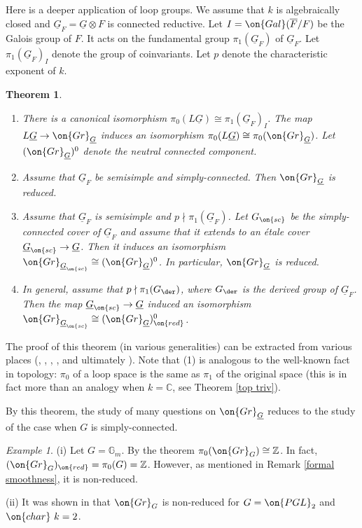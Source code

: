 \documentclass[]{pcmi}
\theoremstyle{plain}
\newtheorem{thm}[equation]{Theorem}
\theoremstyle{remark}
\newtheorem{ex}[equation]{Example}
\theoremstyle{definition}
\newcommand{\bC}{{\mathbb C}}
\newcommand{\bG}{{\mathbb G}}
\newcommand{\bZ}{{\mathbb Z}}
\newcommand{\cha}{{\on{char}}}
\newcommand{\Gal}{{\on{Gal}}}
\newcommand{\Gr}{{\on{Gr}}}
\begin{document}
Here is a deeper application of loop groups. We assume that $k$ is algebraically closed and $\underline G_F=\underline G\otimes F$ is connected reductive. Let $I=\Gal(\overline F/F)$ be the Galois group of $F$.  It acts on the fundamental group $\pi_1(\underline G_F)$ of $\underline G_F$. Let $\pi_1(\underline G_F)_I$ denote the group of coinvariants. Let $p$ denote the characteristic exponent of $k$.
\begin{thm}\label{components}~
\begin{enumerate}
\item There is a canonical isomorphism $\pi_0(L\underline G)\cong \pi_1(\underline G_F)_I$.
 The map $L\underline G\to \Gr_{\underline G}$ induces an isomorphism $\pi_0(L\underline G)\cong \pi_0(\Gr_{\underline G})$. Let $(\Gr_{\underline G})^0$ denote the neutral connected component.
\item Assume that $\underline G_F$ be semisimple and simply-connected. Then $\Gr_{\underline G}$ is reduced.
\item Assume that $\underline G_F$ is semisimple and $p\nmid \pi_1(\underline G_F)$. Let $G_{\on{sc}}$ be the simply-connected cover of $\underline G_F$ and assume that it extends to an \'etale cover $\underline G_{\on{sc}}\to \underline G$. Then it induces an isomorphism
$\Gr_{\underline G_{\on{sc}}}\cong (\Gr_{\underline G})^0$. In particular, $\Gr_{\underline G}$ is reduced. 
\item In general, assume that $p\nmid \pi_1(G_\der)$, where $G_\der$ is the derived group of $\underline G_F$. Then the map $\underline G_{\on{sc}}\to \underline G$ induced an isomorphism $\Gr_{\underline G_{\on{sc}}}\cong (\Gr_{\underline G})^0_{\on{red}}$.
\end{enumerate}
\end{thm}
The proof of this theorem (in various generalities) can be extracted from various places (\cite[\S 4.5]{BD}, \cite{BL}, \cite{LS}, \cite{BLS}, \cite{Fa} and ultimately \cite{PR}). Note that (1) is analogous to the well-known fact in topology: $\pi_0$ of a loop space is the same as $\pi_1$ of the original space (this is in fact more than an analogy when $k=\bC$, see Theorem \ref{top triv}).

By this theorem, the study of many questions on $\Gr_{\underline G}$ reduces to the study of the case when $G$ is simply-connected.

\begin{ex}
(i) Let $G=\bG_m$. By the theorem $\pi_0(\Gr_G)\cong \bZ$. In fact, $(\Gr_G)_{\on{red}}=\pi_0(G)=\bZ$. However, as mentioned in Remark \ref{formal smoothness}, it is non-reduced.

(ii) It was shown in \cite[Remark 6.4]{PR} that $\Gr_G$ is non-reduced for $G=\on{PGL}_2$ and $\cha\ k=2$.
\end{ex}
\end{document}
